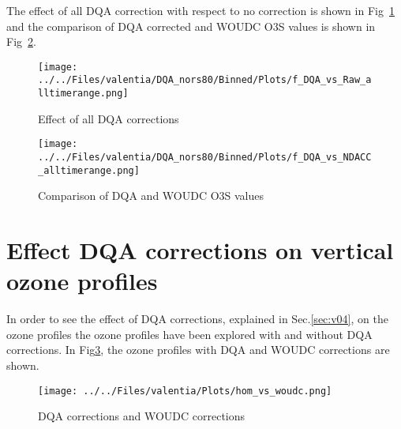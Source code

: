\documentclass{article}
\begin{document}
The effect of all DQA correction with respect to no correction is shown in Fig~\ref{fig:dqa_all} and the comparison of DQA corrected and
WOUDC O3S values is shown in Fig~\ref{fig:fig_dqa_ndacc}.

                        \begin{figure}
        \centering
\texttt{[image: ../../Files/valentia/DQA\_nors80/Binned/Plots/f\_DQA\_vs\_Raw\_alltimerange.png]}
    \caption{Effect of all DQA corrections}
            \label{fig:dqa_all}
    \end{figure}
%
                        \begin{figure}
        \centering
\texttt{[image: ../../Files/valentia/DQA\_nors80/Binned/Plots/f\_DQA\_vs\_NDACC\_alltimerange.png]}
    \caption{Comparison of DQA and WOUDC O3S values}
            \label{fig:fig_dqa_ndacc}
    \end{figure}
%
    \section{Effect DQA corrections on vertical ozone profiles }
%
    In order to see the effect of DQA corrections, explained in Sec.\ref{sec:v04}, on the ozone profiles
the ozone profiles have been
explored with and without DQA corrections. In Fig\ref{fig:pl_ndacc}, the ozone profiles with DQA and
WOUDC corrections are shown.
                                \begin{figure}
        \centering
\texttt{[image: ../../Files/valentia/Plots/hom\_vs\_woudc.png]}
    \caption{DQA corrections and WOUDC corrections}
            \label{fig:pl_ndacc}
    \end{figure}
\end{document}
